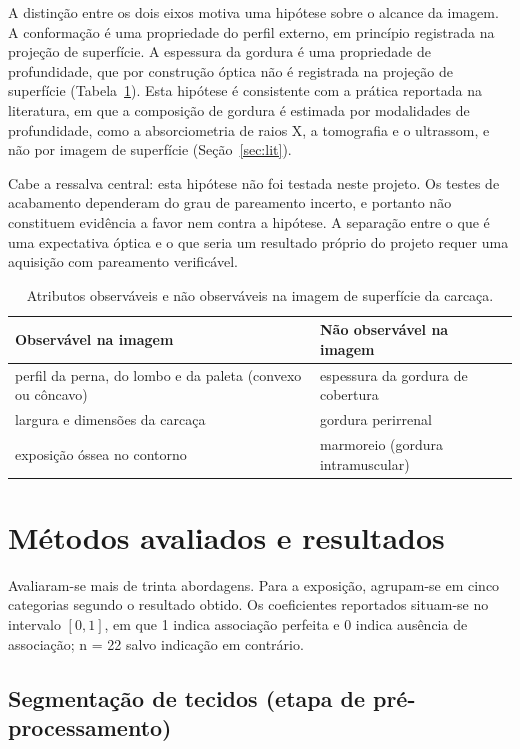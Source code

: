 \documentclass[12pt,a4paper]{article}
\begin{document}
A distinção entre os dois eixos motiva uma hipótese sobre o alcance da imagem. A
conformação é uma propriedade do perfil externo, em princípio registrada na projeção de
superfície. A espessura da gordura é uma propriedade de profundidade, que por
construção óptica não é registrada na projeção de superfície (Tabela~\ref{tab:foto}).
Esta hipótese é consistente com a prática reportada na literatura, em que a composição
de gordura é estimada por modalidades de profundidade, como a absorciometria de raios X,
a tomografia e o ultrassom, e não por imagem de superfície (Seção~\ref{sec:lit}).

Cabe a ressalva central: esta hipótese não foi testada neste projeto. Os testes de
acabamento dependeram do grau de pareamento incerto, e portanto não constituem
evidência a favor nem contra a hipótese. A separação entre o que é uma expectativa
óptica e o que seria um resultado próprio do projeto requer uma aquisição com pareamento
verificável.

\begin{table}[!ht]
\centering
\caption{Atributos observáveis e não observáveis na imagem de superfície da carcaça.}
\label{tab:foto}
\begin{tabular}{p{6.6cm}p{6.6cm}}
\toprule
Observável na imagem & Não observável na imagem \\
\midrule
perfil da perna, do lombo e da paleta (convexo ou côncavo) & espessura da gordura de
cobertura \\
largura e dimensões da carcaça & gordura perirrenal \\
exposição óssea no contorno & marmoreio (gordura intramuscular) \\
\bottomrule
\end{tabular}
\end{table}

\section{Métodos avaliados e resultados}

Avaliaram-se mais de trinta abordagens. Para a exposição, agrupam-se em cinco categorias
segundo o resultado obtido. Os coeficientes reportados situam-se no intervalo $[0,1]$,
em que 1 indica associação perfeita e 0 indica ausência de associação; n = 22 salvo
indicação em contrário.

\subsection{Segmentação de tecidos (etapa de pré-processamento)}
\end{document}
